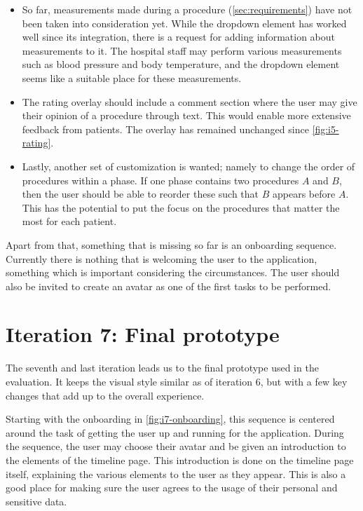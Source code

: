 \begin{itemize}
    \item So far, measurements made during a procedure (\autoref{sec:requirements}) have not been taken into consideration yet. While the dropdown element has worked well since its integration, there is a request for adding information about measurements to it. The hospital staff may perform various measurements such as blood pressure and body temperature, and the dropdown element seems like a suitable place for these measurements.

    \item The rating overlay should include a comment section where the user may give their opinion of a procedure through text. This would enable more extensive feedback from patients. The overlay has remained unchanged since \autoref{fig:i5-rating}.
    
    \item Lastly, another set of customization is wanted; namely to change the order of procedures within a phase. If one phase contains two procedures $A$ and $B$, then the user should be able to reorder these such that $B$ appears before $A$. This has the potential to put the focus on the procedures that matter the most for each patient.
\end{itemize}

Apart from that, something that is missing so far is an onboarding sequence. Currently there is nothing that is welcoming the user to the application, something which is important considering the circumstances. The user should also be invited to create an avatar as one of the first tasks to be performed.

\section{Iteration 7: Final prototype}
\label{sec:iteration7}

The seventh and last iteration leads us to the final prototype used in the evaluation. It keeps the visual style similar as of iteration 6, but with a few key changes that add up to the overall experience.

Starting with the onboarding in \autoref{fig:i7-onboarding}, this sequence is centered around the task of getting the user up and running for the application. During the sequence, the user may choose their avatar and be given an introduction to the elements of the timeline page. This introduction is done on the timeline page itself, explaining the various elements to the user as they appear. This is also a good place for making sure the user agrees to the usage of their personal and sensitive data.

